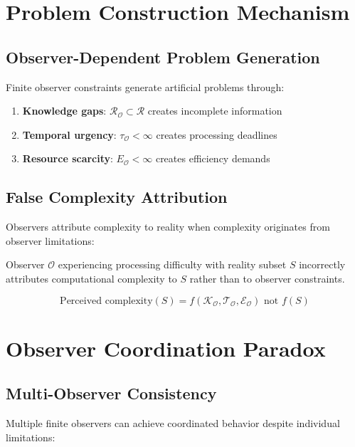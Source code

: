 \documentclass{article}
\begin{document}
\section{Problem Construction Mechanism}

\subsection{Observer-Dependent Problem Generation}
\begin{theorem}
Finite observer constraints generate artificial problems through:
\begin{enumerate}
    \item \textbf{Knowledge gaps}: $\mathcal{R}_{\mathcal{O}} \subset \mathcal{R}$ creates incomplete information
    \item \textbf{Temporal urgency}: $\tau_{\mathcal{O}} < \infty$ creates processing deadlines  
    \item \textbf{Resource scarcity}: $E_{\mathcal{O}} < \infty$ creates efficiency demands
\end{enumerate}
\end{theorem}

\subsection{False Complexity Attribution}
Observers attribute complexity to reality when complexity originates from observer limitations:

\begin{definition}
Observer $\mathcal{O}$ experiencing processing difficulty with reality subset $S$ incorrectly attributes computational complexity to $S$ rather than to observer constraints.
\end{definition}

\begin{proposition}
$$\text{Perceived complexity}(S) = f(\mathcal{K}_{\mathcal{O}}, \mathcal{T}_{\mathcal{O}}, \mathcal{E}_{\mathcal{O}}) \text{ not } f(S)$$
\end{proposition}

\section{Observer Coordination Paradox}

\subsection{Multi-Observer Consistency}
Multiple finite observers can achieve coordinated behavior despite individual limitations:
\end{document}
